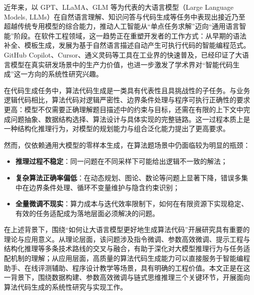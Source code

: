 
近年来，以 GPT、LLaMA、GLM 等为代表的大语言模型（Large Language Models, LLMs）在自然语言理解、知识问答与代码生成等任务中表现出接近乃至超越传统专用模型的综合能力，推动人工智能从“单点任务求解”迈向“通用语言智能”阶段\cite{brown2020language,radford2019language,zhang2026llm4se,yang2024dlcodegen,cao2025kgllm}。在软件工程领域，这一趋势正在重塑开发者的工作方式：从早期的语法补全、模板生成，发展为基于自然语言描述自动产生可执行代码的智能编程范式。GitHub Copilot、Cursor、通义灵码等工具在工业界的快速普及，已经印证了大语言模型在真实研发场景中的生产力价值，也进一步激发了学术界对“智能代码生成”这一方向的系统性研究兴趣。

在代码生成任务中，算法代码生成是一类具有代表性且具挑战性的子任务\cite{yang2024dlcodegen,li2026constrained}。与业务逻辑代码相比，算法代码对逻辑严密性、边界条件处理与程序可执行正确性的要求更高：模型不仅需要正确理解题目描述中的约束与目标，还需在有限的上下文中完成问题抽象、数据结构选择、算法设计与具体实现的完整链路。这一过程本质上是一种结构化推理行为，对模型的规划能力与组合泛化能力提出了更高要求。

然而，仅依赖通用大模型的零样本生成，在算法题场景中仍面临较为明显的瓶颈：
\begin{itemize}
    \item \textbf{推理过程不稳定}：同一问题在不同采样下可能给出逻辑不一致的解法；
    \item \textbf{复杂算法正确率偏低}：在动态规划、图论、数论等问题上显著下降，错误多集中在边界条件处理、循环不变量维护与隐含约束识别；
    \item \textbf{全量微调不现实}：算力成本与迭代效率限制下，如何在有限资源下实现稳定、有效的任务适配成为落地层面必须解决的问题。
\end{itemize}

在上述背景下，围绕“如何让大语言模型更好地生成算法代码”开展研究具有重要的理论与应用意义。从理论层面，该问题涉及指令微调、参数高效微调、提示工程与结构化推理等多条技术路线的交叉与融合，有助于深化对大模型推理行为与任务适配机制的理解；从应用层面，高质量的算法代码生成能力可以直接服务于智能编程助手、在线评测辅助、程序设计教学等场景，具有明确的工程价值。本文正是在这一背景下，围绕数据构建、参数高效微调与链式思维推理三个关键环节，开展面向算法代码生成的系统性研究与实现工作。
